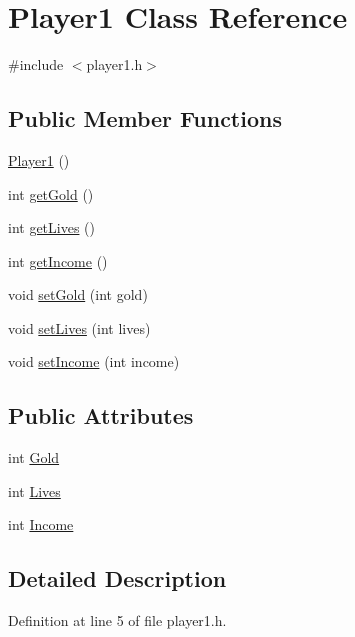 \hypertarget{class_player1}{}\section{Player1 Class Reference}
\label{class_player1}


{\ttfamily \#include $<$player1.\+h$>$}

\subsection*{Public Member Functions}
\begin{DoxyCompactItemize}
\item 
\hyperlink{class_player1_a412188402865939ebc4e2aa1e5a214a2}{Player1} ()
\item 
int \hyperlink{class_player1_a9395a16fecb7b96395455f096ac1b60b}{get\+Gold} ()
\item 
int \hyperlink{class_player1_afb2adc7bd83c6380fbb85a832e083f4d}{get\+Lives} ()
\item 
int \hyperlink{class_player1_a1bc2927827b94667b6f2d115ae95fb75}{get\+Income} ()
\item 
void \hyperlink{class_player1_afb8807754032eba459edf031bb344653}{set\+Gold} (int gold)
\item 
void \hyperlink{class_player1_ac12457900903d22789531287e9934b8b}{set\+Lives} (int lives)
\item 
void \hyperlink{class_player1_a2e44127463fa785a00a0e118d5e8cf4f}{set\+Income} (int income)
\end{DoxyCompactItemize}
\subsection*{Public Attributes}
\begin{DoxyCompactItemize}
\item 
int \hyperlink{class_player1_ab390478b345e443398bac442a04b675c}{Gold}
\item 
int \hyperlink{class_player1_aacba034528d5c9fdefa4f246fe526a38}{Lives}
\item 
int \hyperlink{class_player1_a414fae948c79246f6a98554718f0cd99}{Income}
\end{DoxyCompactItemize}


\subsection{Detailed Description}


Definition at line 5 of file player1.\+h.



